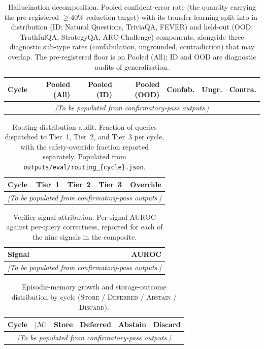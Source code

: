\begin{table}[t]
\centering
\caption{Hallucination decomposition. Pooled confident-error rate
(the quantity carrying the pre-registered $\geq 40\%$ reduction
target) with its transfer-learning split into in-distribution
(ID: Natural Questions, TriviaQA, FEVER) and held-out
(OOD: TruthfulQA, StrategyQA, ARC-Challenge) components, alongside
three diagnostic sub-type rates (confabulation, ungrounded,
contradiction) that may overlap. The pre-registered floor is on
Pooled (All); ID and OOD are diagnostic audits of generalisation.}
\label{tab:halluc}
\small
\begin{tabular}{lrrrrrr}
\toprule
Cycle & Pooled (All) & Pooled (ID) & Pooled (OOD) & Confab. & Ungr. & Contra. \\
\midrule
\multicolumn{7}{c}{\emph{[To be populated from confirmatory-pass outputs.]}}\\
\bottomrule
\end{tabular}
\end{table}

\begin{table}[t]
\centering
\caption{Routing-distribution audit. Fraction of queries dispatched
to Tier~1, Tier~2, and Tier~3 per cycle, with the safety-override
fraction reported separately. Populated from
\texttt{outputs/eval/routing\_\{cycle\}.json}.}
\label{tab:routing}
\begin{tabular}{lrrrr}
\toprule
Cycle & Tier~1 & Tier~2 & Tier~3 & Override \\
\midrule
\multicolumn{5}{c}{\emph{[To be populated from confirmatory-pass outputs.]}}\\
\bottomrule
\end{tabular}
\end{table}

\begin{table}[t]
\centering
\caption{Verifier-signal attribution. Per-signal AUROC against
per-query correctness, reported for each of the nine signals in
the composite.}
\label{tab:verifier-attrib}
\begin{tabular}{lr}
\toprule
Signal & AUROC \\
\midrule
\multicolumn{2}{c}{\emph{[To be populated from confirmatory-pass outputs.]}}\\
\bottomrule
\end{tabular}
\end{table}

\begin{table}[t]
\centering
\caption{Episodic-memory growth and storage-outcome distribution by
cycle (\textsc{Store} / \textsc{Deferred} / \textsc{Abstain} /
\textsc{Discard}).}
\label{tab:memory-growth}
\begin{tabular}{lrrrrr}
\toprule
Cycle & $|\mathcal{M}|$ & Store & Deferred & Abstain & Discard \\
\midrule
\multicolumn{6}{c}{\emph{[To be populated from confirmatory-pass outputs.]}}\\
\bottomrule
\end{tabular}
\end{table}


